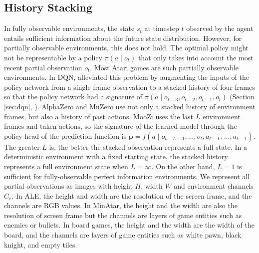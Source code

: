 \subsection{History Stacking} \label{sec:history_stacking}
In fully observable environments, the state $s_t$ at timestep $t$ observed by the agent entails sufficient information about the future state distribution.
However, for partially observable environments, this does not hold.
The optimal policy might not be representable by a policy $\pi(a \mid o_t)$ that only takes into account the most recent partial observation $o_t$.
Most Atari games are such partially observable environments.
In DQN, \citeauthor{PlayingAtariDeep_Mnih.Kavukcuoglu.ea_2013} alleviated this problem by augmenting the inputs of the policy network from a single frame observation to a stacked history of four frames so that the policy network had a signature of $\pi(a \mid o_{t-3}, o_{t-2}, o_{t-1}, o_t)$ (Section \ref{sec:dqn}, \cite{PlayingAtariDeep_Mnih.Kavukcuoglu.ea_2013}).
AlphaZero and MuZero use not only a stacked history of environment frames, but also a history of past actions.
MooZi uses the last $L$ environment frames and taken actions, so the signature of the learned model through the policy head of the prediction function is $\mathbf{p} = f(a \mid o_{t - L + 1}, \dots, o_t, a_{t - L}, \dots, a_{t-1})$.
The greater $L$ is, the better the stacked observation represents a full state.
In a deterministic environment with a fixed starting state, the stacked history represents a full environment state when $L = \infty$.
On the other hand, $L = 1$ is sufficient for fully-observable perfect information environments.
We represent all partial observations as images with height $H$, width $W$ and environment channels $C_e$.
In ALE, the height and width are the resolution of the screen frame, and the channels are RGB values.
In MinAtar, the height and the width are also the resolution of screen frame but the channels are layers of game entities such as enemies or bullets.
In board games, the height and the width are the width of the board, and the channels are layers of game entities such as white pawn, black knight, and empty tiles.

